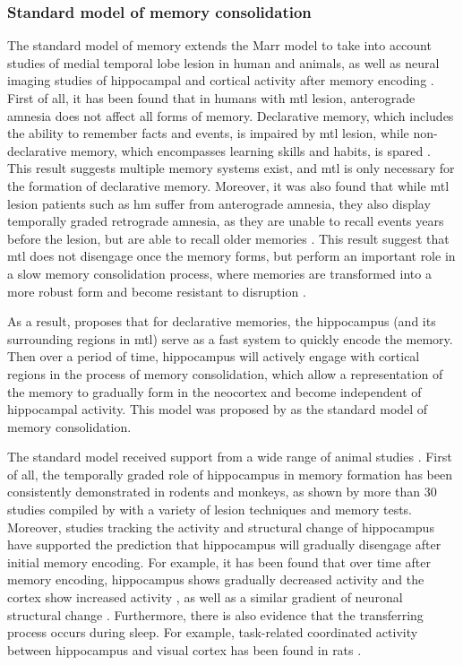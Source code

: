 \subsubsection{Standard model of memory consolidation \label{hpc-squire}}
The standard model of memory extends the Marr model to take into account studies of medial temporal lobe lesion in human and animals, as well as neural imaging studies of hippocampal and cortical activity after memory encoding \citep{squire92, squire09}. First of all, it has been found that in humans with \gls{mtl} lesion, anterograde amnesia does not affect all forms of memory. Declarative memory, which includes the ability to remember facts and events, is impaired by \gls{mtl} lesion, while non-declarative memory, which encompasses learning skills and habits, is spared \citep{cohen80, squire04}. This result suggests multiple memory systems exist, and \gls{mtl} is only necessary for the formation of declarative memory. Moreover, it was also found that while \gls{mtl} lesion patients such as \gls{hm} suffer from anterograde amnesia, they also display temporally graded retrograde amnesia, as they are unable to recall events years before the lesion, but are able to recall older memories \citep{marslen-wilson75}. This result suggest that \gls{mtl} does not disengage once the memory forms, but perform an important role in a slow memory consolidation process, where memories are transformed into a more robust form and become resistant to disruption \citep{squire92}. 

As a result, \citet{squire92} proposes that for declarative memories, the hippocampus (and its surrounding regions in \gls{mtl}) serve as a fast system to quickly encode the memory. Then over a period of time, hippocampus will actively engage with cortical regions in the process of memory consolidation, which allow a representation of the memory to gradually form in the neocortex and become independent of hippocampal activity. This model was proposed by \citet{squire92} as the standard model of memory consolidation. 

The standard model received support from a wide range of animal studies \citep{squire09}. First of all, the temporally graded role of hippocampus in memory formation has been consistently demonstrated in rodents and monkeys, as shown by more than 30 studies compiled by \citet{frankland05} with a variety of lesion techniques and memory tests. Moreover, studies tracking the activity and structural change of hippocampus have supported the prediction that hippocampus will gradually disengage after initial memory encoding. For example, it has been found that over time after memory encoding, hippocampus shows gradually decreased activity and the cortex show increased activity \citep[e.g.,][]{bontempi99, frankland04a, takehara-nishiuchi06}, as well as a similar gradient of neuronal structural change \citep[e.g.][]{routtenberg00, maviel04, restivo09}. Furthermore, there is also evidence that the transferring process occurs during sleep. For example, task-related coordinated activity between hippocampus and visual cortex has been found in rats \citep{ji07} . 

